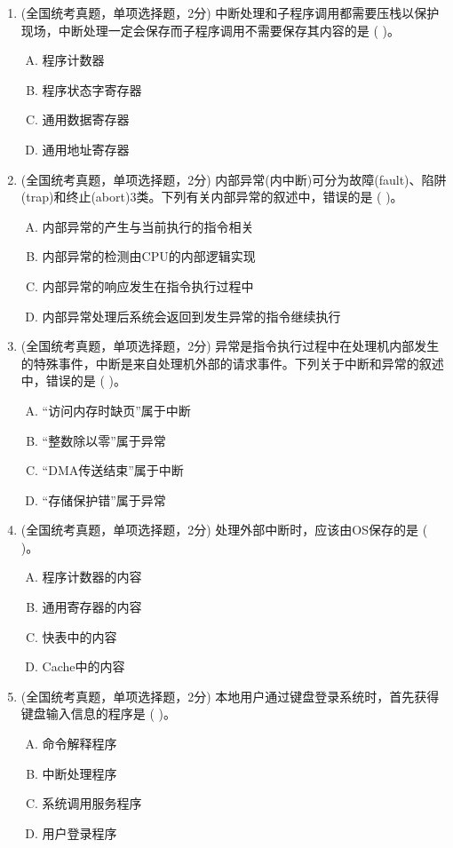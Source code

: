 \documentclass[lang=cn,newtx,10pt,scheme=chinese]{../../elegantbook}
\begin{document}
\begin{enumerate}
    \item (全国统考真题，单项选择题，2分) 中断处理和子程序调用都需要压栈以保护现场，中断处理一定会保存而子程序调用不需要保存其内容的是 (    )。
    \begin{enumerate}[A.]
        \item 程序计数器
        \item 程序状态字寄存器
        \item 通用数据寄存器
        \item 通用地址寄存器
    \end{enumerate}

    \item (全国统考真题，单项选择题，2分) 内部异常(内中断)可分为故障(fault)、陷阱(trap)和终止(abort)3类。下列有关内部异常的叙述中，错误的是 (    )。
    \begin{enumerate}[A.]
        \item 内部异常的产生与当前执行的指令相关
        \item 内部异常的检测由CPU的内部逻辑实现
        \item 内部异常的响应发生在指令执行过程中
        \item 内部异常处理后系统会返回到发生异常的指令继续执行
    \end{enumerate}

    \item (全国统考真题，单项选择题，2分) 异常是指令执行过程中在处理机内部发生的特殊事件，中断是来自处理机外部的请求事件。下列关于中断和异常的叙述中，错误的是 (    )。
    \begin{enumerate}[A.]
        \item “访问内存时缺页”属于中断
        \item “整数除以零”属于异常
        \item “DMA传送结束”属于中断
        \item “存储保护错”属于异常
    \end{enumerate}

    \item (全国统考真题，单项选择题，2分) 处理外部中断时，应该由OS保存的是 (    )。
    \begin{enumerate}[A.]
        \item 程序计数器的内容
        \item 通用寄存器的内容
        \item 快表中的内容
        \item Cache中的内容
    \end{enumerate}

    \item (全国统考真题，单项选择题，2分) 本地用户通过键盘登录系统时，首先获得键盘输入信息的程序是 (    )。
    \begin{enumerate}[A.]
        \item 命令解释程序
        \item 中断处理程序
        \item 系统调用服务程序
        \item 用户登录程序
    \end{enumerate}


\end{enumerate}
\end{document}
